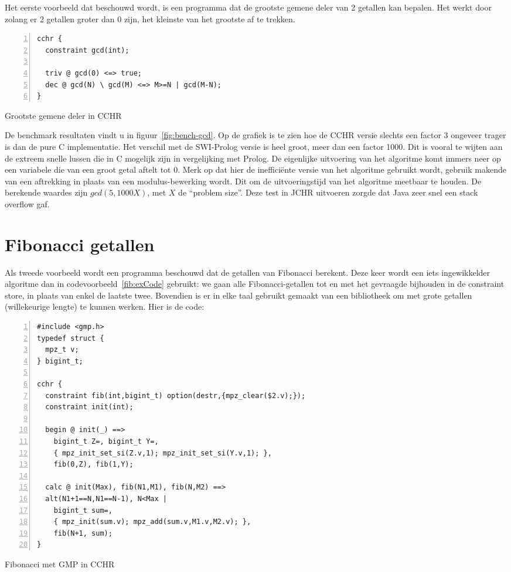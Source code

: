 Het eerste voorbeeld dat beschouwd wordt, is een programma dat de grootste gemene deler van 2 getallen kan bepalen. Het werkt door zolang er 2 getallen groter dan 0 zijn, het kleinste van het grootste af te trekken. 
\begin{exCode}
\begin{Verbatim}[frame=single,numbers=left]
cchr {
  constraint gcd(int);

  triv @ gcd(0) <=> true;
  dec @ gcd(N) \ gcd(M) <=> M>=N | gcd(M-N);
}
\end{Verbatim}
\caption{\label{code:fib} Grootste gemene deler in CCHR}
\end{exCode}
De benchmark resultaten vindt u in figuur~\ref{fig:bench-gcd}. Op de grafiek is te zien hoe de CCHR versie slechts een factor 3 ongeveer trager is dan de pure C implementatie. Het verschil met de SWI-Prolog versie is heel groot, meer dan een factor 1000. Dit is vooral te wijten aan de extreem snelle lussen die in C mogelijk zijn in vergelijking met Prolog. De eigenlijke uitvoering van het algoritme komt immers neer op een variabele die van een groot getal aftelt tot 0. Merk op dat hier de ineffici\"ente versie van het algoritme gebruikt wordt, gebruik makende van een aftrekking in plaats van een modulus-bewerking wordt. Dit om de uitvoeringstijd van het algoritme meetbaar te houden. De berekende waardes zijn $gcd(5,1000 X)$, met $X$ de ``problem size''. Deze test in JCHR uitvoeren zorgde dat Java zeer snel een stack overflow gaf.

\section{Fibonacci getallen} \label{sec:bench-fib}

Als tweede voorbeeld wordt een programma beschouwd dat de getallen van Fibonacci berekent. Deze keer wordt een iets ingewikkelder algoritme dan in codevoorbeeld~\ref{fib:exCode} gebruikt: we gaan alle Fibonacci-getallen tot en met het gevraagde bijhouden in de constraint store, in plaats van enkel de laatste twee. Bovendien is er in elke taal gebruikt gemaakt van een bibliotheek om met grote getallen (willekeurige lengte) te kunnen werken. Hier is de code:
\begin{exCode}
\begin{Verbatim}[frame=single,numbers=left]
#include <gmp.h>
typedef struct {
  mpz_t v;
} bigint_t;

cchr {
  constraint fib(int,bigint_t) option(destr,{mpz_clear($2.v);});
  constraint init(int);
  
  begin @ init(_) ==> 
    bigint_t Z=, bigint_t Y=, 
    { mpz_init_set_si(Z.v,1); mpz_init_set_si(Y.v,1); },
    fib(0,Z), fib(1,Y);

  calc @ init(Max), fib(N1,M1), fib(N,M2) ==>
  alt(N1+1==N,N1==N-1), N<Max |
    bigint_t sum=,
    { mpz_init(sum.v); mpz_add(sum.v,M1.v,M2.v); },
    fib(N+1, sum);
}
\end{Verbatim}
\caption{\label{code:fibgmp} Fibonacci met GMP in CCHR}
\end{exCode}

